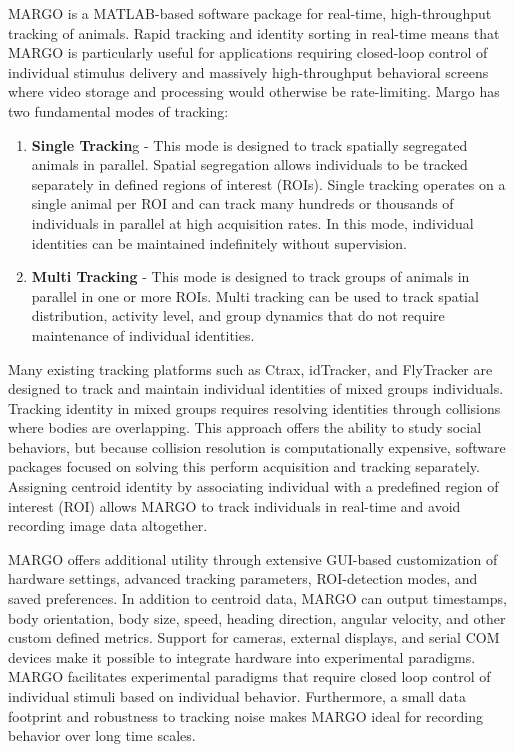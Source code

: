\documentclass[11pt]{article}
\begin{document}
MARGO is a MATLAB-based software package for real-time, high-throughput tracking of animals. Rapid tracking and identity sorting in real-time means that MARGO is particularly useful for applications requiring closed-loop control of individual stimulus delivery and massively high-throughput behavioral screens where video storage and processing would otherwise be rate-limiting. Margo has two fundamental modes of tracking: 
\begin{enumerate}
	\item \textbf{Single Trackin}g - This mode is designed to track spatially segregated animals in parallel. Spatial segregation allows individuals to be tracked separately in defined regions of interest (ROIs). Single tracking operates on a single animal per ROI and can track many hundreds or thousands of individuals in parallel at high acquisition rates. In this mode, individual identities can be maintained indefinitely without supervision.
	\item \textbf{Multi Tracking} - This mode is designed to track groups of animals in parallel in one or more ROIs. Multi tracking can be used to track spatial distribution, activity level, and group dynamics that do not require maintenance of individual identities.
\end{enumerate}
Many existing tracking platforms such as Ctrax, idTracker, and FlyTracker are designed to track and maintain individual identities of mixed groups individuals. Tracking identity in mixed groups requires resolving identities through collisions where bodies are overlapping. This approach offers the ability to study social behaviors, but because collision resolution is computationally expensive, software packages focused on solving this perform acquisition and tracking separately. Assigning centroid identity by associating individual with a predefined region of interest (ROI) allows MARGO to track individuals in real-time and avoid recording image data altogether. 

MARGO offers additional utility through extensive GUI-based customization of hardware settings, advanced tracking parameters, ROI-detection modes, and saved preferences. In addition to centroid data, MARGO can output timestamps, body orientation, body size, speed, heading direction, angular velocity, and other custom defined metrics. Support for cameras, external displays, and serial COM devices make it possible to integrate hardware into experimental paradigms. MARGO facilitates experimental paradigms that require closed loop control of individual stimuli based on individual behavior. Furthermore, a small data footprint and robustness to tracking noise makes MARGO ideal for recording behavior over long time scales.
\end{document}
